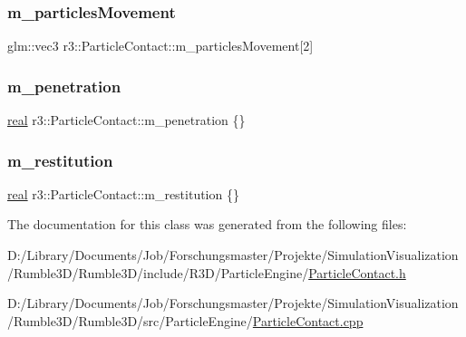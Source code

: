 \mbox{\label{classr3_1_1_particle_contact_a07cacabf6612218466b393091db97ec6}} 
\subsubsection{\texorpdfstring{m\+\_\+particles\+Movement}{m\_particlesMovement}}
{\footnotesize\ttfamily glm\+::vec3 r3\+::\+Particle\+Contact\+::m\+\_\+particles\+Movement\mbox{[}2\mbox{]}}

\mbox{\label{classr3_1_1_particle_contact_a9c0b9355187b9cb9339f108da11f4244}} 
\subsubsection{\texorpdfstring{m\+\_\+penetration}{m\_penetration}}
{\footnotesize\ttfamily \mbox{\hyperlink{namespacer3_ab2016b3e3f743fb735afce242f0dc1eb}{real}} r3\+::\+Particle\+Contact\+::m\+\_\+penetration \{\}}

\mbox{\label{classr3_1_1_particle_contact_ad5c4ed20d7bed8526d4e9ae918d2f74f}} 
\subsubsection{\texorpdfstring{m\+\_\+restitution}{m\_restitution}}
{\footnotesize\ttfamily \mbox{\hyperlink{namespacer3_ab2016b3e3f743fb735afce242f0dc1eb}{real}} r3\+::\+Particle\+Contact\+::m\+\_\+restitution \{\}}



The documentation for this class was generated from the following files\+:\begin{DoxyCompactItemize}
\item 
D\+:/\+Library/\+Documents/\+Job/\+Forschungsmaster/\+Projekte/\+Simulation\+Visualization/\+Rumble3\+D/\+Rumble3\+D/include/\+R3\+D/\+Particle\+Engine/\mbox{\hyperlink{_particle_contact_8h}{Particle\+Contact.\+h}}\item 
D\+:/\+Library/\+Documents/\+Job/\+Forschungsmaster/\+Projekte/\+Simulation\+Visualization/\+Rumble3\+D/\+Rumble3\+D/src/\+Particle\+Engine/\mbox{\hyperlink{_particle_contact_8cpp}{Particle\+Contact.\+cpp}}\end{DoxyCompactItemize}
